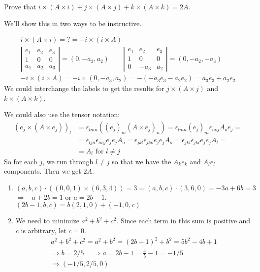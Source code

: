 \documentclass[twoside]{amsart}
\theoremstyle{plain}
\theoremstyle{definition}
\newcommand{\exercisehead}[1]
  {\smallskip
   \noindent{\small\bf Exercise #1.}}
\begin{document}
\exercisehead{5} Prove that $i\times (A\times i) + j \times (A \times j) + k \times (A \times k ) = 2A$.  

We'll show this in two ways to be instructive.  

\[
\begin{gathered}
  i \times (A \times i ) = ? = -i \times (i \times A) \\
  \left| \begin{matrix}
    e_1 & e_2 & e_3 \\
    1 & 0 & 0 \\
    a_1 & a_2 & a_3 
\end{matrix} \right| = (0,-a_3, a_2)  \quad \quad \left| \begin{matrix} 
      e_1 & e_2 & e_3 \\
      1 & 0 & 0 \\
      0 & -a_3 & a_2 
      \end{matrix} \right|
    = (0,-a_2, -a_3) \\
    -i \times (i \times A ) = -i \times (0, -a_3, a_2) = -( -a_3 e_3 - a_2 e_2) = a_3 e_3 + a_2 e_2
\end{gathered}
\]
We could interchange the labels to get the results for $j\times (A \times j)$ and $k \times (A \times k)$.  

We could also use the tensor notation:
\[
\begin{aligned}
(e_j \times (A \times e_j))_l & = \epsilon_{lmn} ((e_j)_m (A \times e_j)_n ) = \epsilon_{lmn}(e_j)_m \epsilon_{noj} A_o e_j =   \\
  & = \epsilon_{ljn} \epsilon_{noj} e_j e_j A_o = \epsilon_{jkl} \epsilon_{jko} e_j e_j A_o = \epsilon_{jkl}\epsilon_{jkl} e_j e_j A_l = \\
  & = A_l \text{ for $l \neq j$ }
\end{aligned}
\]
So for each $j$, we run through $l\neq j$ so that we have the $A_k e_k$ and $A_l e_l$ components.  Then we get $2A$.  

\exercisehead{6} 
\begin{enumerate}
\item $(a,b,c) \cdot ((0,0,1) \times (6,3,4)) = 3 = (a,b,c) \cdot (3,6,0) = -3a + 6b = 3$  \quad $\Longrightarrow -a + 2b = 1 \text{ or } a = 2b -1$.  \smallskip \\
  $\boxed{ (2b-1,b,c) } = b(2,1,0) + (-1,0,c) $
\item We need to minimize $a^2 + b^2 + c^2$.  Since each term in this sum is positive and $c$ is arbitrary, let $c=0$.  
\[
\begin{gathered}
  a^2 + b^2 + c^2 = a^2 + b^2 = (2b-1)^2 + b^2 = 5b^2 -4b + 1 \\
  \Longrightarrow b= 2/5 \, \quad \Longrightarrow a = 2b - 1 = \frac{4}{5} - 1 = -1/5 \\ 
  \Longrightarrow \boxed{ (-1/5,2/5,0) }
\end{gathered}
\]
\end{enumerate}
\end{document}
